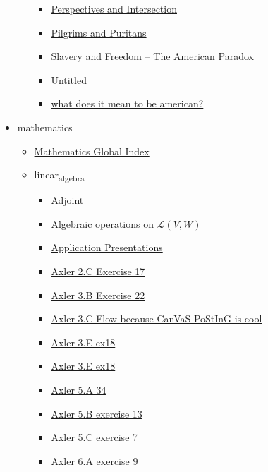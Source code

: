 \documentclass[11pt]{article}
\begin{document}
\begin{itemize}
\begin{itemize}
\begin{itemize}
\item \href{history/history11/KBhHIST301IndianPersp.org}{Perspectives and Intersection}
\item \href{history/history11/KBdPilgrimsPuritans.org}{Pilgrims and Puritans}
\item \href{history/history11/KBxSlaveryandFreedomTheAmericanParadox.org}{Slavery and Freedom -- The American Paradox}
\item \href{history/history11/Untitled.org}{Untitled}
\item \href{history/history11/KBxWhatDoesItMeanToBeAmerican.org}{what does it mean to be american?}
\end{itemize}
\end{itemize}
\item mathematics
\begin{itemize}
\item \href{mathematics/index.org}{Mathematics Global Index}
\item linear\textsubscript{algebra}
\begin{itemize}
\item \href{mathematics/linear\_algebra/KBrefAdjoints.org}{Adjoint}
\item \href{mathematics/linear\_algebra/KBrefLinearMapAlgebra.org}{Algebraic operations on \(\mathcal{L}(V, W)\)}
\item \href{mathematics/linear\_algebra/KBe20math530floApplicationPresentations.org}{Application Presentations}
\item \href{mathematics/linear\_algebra/KBe20math530retAxler2C17.org}{Axler 2.C Exercise 17}
\item \href{mathematics/linear\_algebra/KBe20math530retAxler3B22.org}{Axler 3.B Exercise 22}
\item \href{mathematics/linear\_algebra/KBe20math530floAxler3C.org}{Axler 3.C Flow because CanVaS PoStInG is cool}
\item \href{mathematics/linear\_algebra/KBe21math530retAxler3E18.org}{Axler 3.E ex18}
\item \href{mathematics/linear\_algebra/KBe21math530retAxler3E18old.org}{Axler 3.E ex18}
\item \href{mathematics/linear\_algebra/KBe21math530retAxler5A34.org}{Axler 5.A 34}
\item \href{mathematics/linear\_algebra/KBe21math530retAxler5B13.org}{Axler 5.B exercise 13}
\item \href{mathematics/linear\_algebra/KBe21math530retAxler5C7.org}{Axler 5.C exercise 7}
\item \href{mathematics/linear\_algebra/KBe21math530retAxler6A9.org}{Axler 6.A exercise 9}

\end{itemize}
\end{itemize}
\end{itemize}
\end{document}
